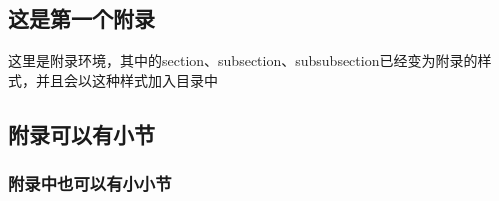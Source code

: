 \documentclass{HustGraduPaper}
\begin{document}
	\clearpage
	
	
	\begin{appendices}
		\section{这是第一个附录}
		这里是附录环境，其中的section、subsection、subsubsection已经变为附录的样式，并且会以这种样式加入目录中
		\subsection{附录可以有小节}
		\subsubsection{附录中也可以有小小节}
	\end{appendices}
	
\end{document}

